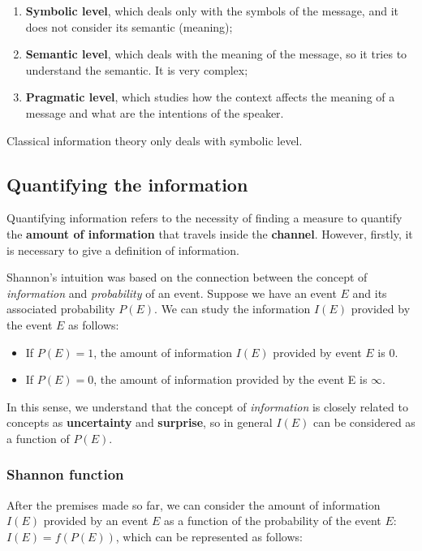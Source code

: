 \begin{enumerate}
    \item \textbf{Symbolic level}, which deals only with the symbols of the message, and it does not consider its semantic (meaning);
    \item \textbf{Semantic level}, which deals with the meaning of the message, so it tries to understand the semantic. It is very complex;
    \item \textbf{Pragmatic level}, which studies how the context affects the meaning of a message and what are the intentions of the speaker.
\end{enumerate}

Classical information theory only deals with symbolic level.

\subsection{Quantifying the information}
Quantifying information refers to the necessity of finding a measure to quantify the \textbf{amount of information} that travels inside the \textbf{channel}. However, firstly, it is necessary to give a definition of information.

Shannon's intuition was based on the connection between the concept of \textit{information} and \textit{probability} of an event. Suppose we have an event $E$ and its associated probability $P(E)$. We can study the information $I(E)$ provided by the event $E$ as follows:

\begin{itemize}
    \item If $P(E) = 1$, the amount of information $I(E)$ provided by event $E$ is 0.
    \item If $P(E) = 0$, the amount of information provided by the event E is $\infty$.
\end{itemize}

In this sense, we understand that the concept of \textit{information} is closely related to concepts as \textbf{uncertainty} and \textbf{surprise}, so in general $I(E)$ can be considered as a function of $P(E)$.

\subsubsection{Shannon function} 
After the premises made so far, we can consider the amount of information $I(E)$ provided by an event $E$ as a function of the probability of the event $E$: $I(E) = f(P(E))$, which can be represented as follows:

